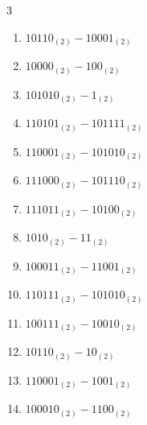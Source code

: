 \begin{multicols}{3}
\begin{enumerate}
  \item $10110_{(2)} - 10001_{(2)}$


  \item $10000_{(2)} - 100_{(2)}$


  \item $101010_{(2)} - 1_{(2)}$


  \item $110101_{(2)} - 101111_{(2)}$


  \item $110001_{(2)} - 101010_{(2)}$


  \item $111000_{(2)} - 101110_{(2)}$


  \item $111011_{(2)} - 10100_{(2)}$


\columnbreak %

  \item $1010_{(2)} - 11_{(2)}$


  \item $100011_{(2)} - 11001_{(2)}$


  \item $110111_{(2)} - 101010_{(2)}$


  \item $100111_{(2)} - 10010_{(2)}$


  \item $10110_{(2)} - 10_{(2)}$


  \item $110001_{(2)} - 1001_{(2)}$


  \item $100010_{(2)} - 1100_{(2)}$


\end{enumerate}
\end{multicols}
